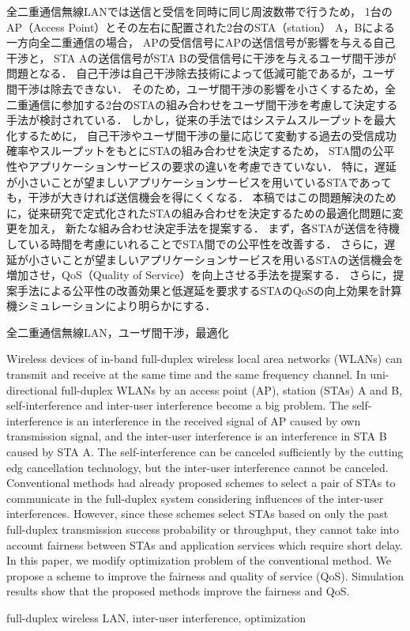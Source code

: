 \documentclass[technicalreport]{ieicej}
\begin{document}
\begin{jabstract}
	全二重通信無線LANでは送信と受信を同時に同じ周波数帯で行うため，
	1台のAP（Access Point）とその左右に配置された2台のSTA（station） A，Bによる一方向全二重通信の場合，
	APの受信信号にAPの送信信号が影響を与える自己干渉と，
	STA Aの送信信号がSTA Bの受信信号に干渉を与えるユーザ間干渉が問題となる．
	自己干渉は自己干渉除去技術によって低減可能であるが，ユーザ間干渉は除去できない．
	そのため，ユーザ間干渉の影響を小さくするため，全二重通信に参加する2台のSTAの組み合わせをユーザ間干渉を考慮して決定する手法が検討されている．
	しかし，従来の手法ではシステムスループットを最大化するために，
	自己干渉やユーザ間干渉の量に応じて変動する過去の受信成功確率やスループットをもとにSTAの組み合わせを決定するため，
	STA間の公平性やアプリケーションサービスの要求の違いを考慮できていない．
	特に，遅延が小さいことが望ましいアプリケーションサービスを用いているSTAであっても，干渉が大きければ送信機会を得にくくなる．
	本稿ではこの問題解決のために，従来研究で定式化されたSTAの組み合わせを決定するための最適化問題に変更を加え，
	新たな組み合わせ決定手法を提案する．
	まず，各STAが送信を待機している時間を考慮にいれることでSTA間での公平性を改善する．
	さらに，遅延が小さいことが望ましいアプリケーションサービスを用いるSTAの送信機会を増加させ，QoS（Quality of Service）を向上させる手法を提案する．
	さらに，提案手法による公平性の改善効果と低遅延を要求するSTAのQoSの向上効果を計算機シミュレーションにより明らかにする．
\end{jabstract}
\begin{jkeyword}
全二重通信無線LAN，ユーザ間干渉，最適化
\end{jkeyword}
\begin{eabstract}
	Wireless devices of in-band full-duplex wireless local area networks (WLANs) can transmit and receive at the same time and the same frequency channel.
	In uni-directional full-duplex WLANs by an access point (AP), station (STAs) A and B,
	self-interference and inter-user interference become a big problem.
	The self-interference is an interference in the received signal of AP caused by own transmission signal,
	and the inter-user interference is an interference in STA B caused by STA A.
	The self-interference can be canceled sufficiently by the cutting edg cancellation technology, but the inter-user interference cannot be canceled.
	Conventional methods had already proposed schemes to select a pair of STAs to communicate in the full-duplex system considering influences of the inter-user interferences.
	However, since these schemes select STAs based on only the past full-duplex transmission success probability or throughput, they cannot take into account fairness between STAs and application services which require short delay.
	In this paper, we modify optimization problem of the conventional method.
	We propose a scheme to improve the fairness and quality of service (QoS).
	Simulation results show that the proposed methods improve the fairness and QoS.

\end{eabstract}
\begin{ekeyword}
full-duplex wireless LAN, inter-user interference, optimization
\end{ekeyword}
\end{document}
